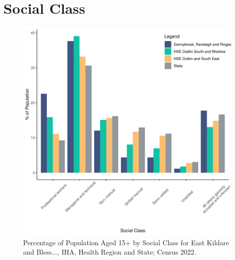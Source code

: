 \documentclass{article}
\begin{document}
\section{Social Class}\label{sect:SC}
\begin{figure}[H]
	\centering
	\includegraphics[width = 140mm]{../figures/SocialClassED.pdf}
	\caption{Percentage of Population Aged 15+ by Social Class for East Kildare and Bless..., IHA, Health Region and State; Census 2022.}
	\label{fig:vbnv}
	\end{figure}
\end{document}
